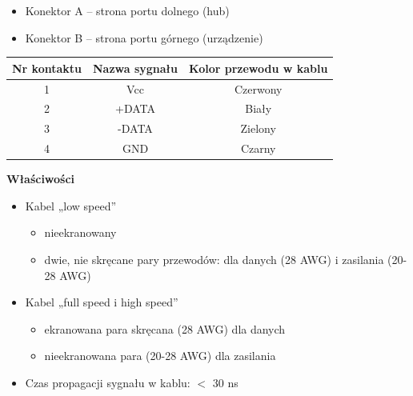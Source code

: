 \documentclass[a4paper,twoside]{article}
\begin{document}
			\begin{itemize}
				\item Konektor A – strona portu dolnego (hub)
				\item Konektor B – strona portu górnego (urządzenie)
			\end{itemize}
			\begin{table}[h]
				\begin{tabular}{|c|c|c|}
					\hline
					\textbf{Nr kontaktu}	& \textbf{Nazwa sygnału}	& \textbf{Kolor przewodu w kablu} \\ \hline
					1 						& Vcc						& Czerwony		\\ \hline
					2 						& +DATA						& Biały			\\ \hline
					3 						& -DATA						& Zielony		\\ \hline
					4 						& GND						& Czarny		\\ \hline
				\end{tabular}
			\end{table}
			\textbf{Właściwości}
			\begin{itemize}
				\item Kabel „low speed”
				\begin{itemize}
					\item nieekranowany
					\item dwie, nie skręcane pary przewodów: dla danych (28 AWG) i zasilania (20-28 AWG)
				\end{itemize}
				\item Kabel „full speed i high speed”
				\begin{itemize}
					\item ekranowana para skręcana (28 AWG) dla danych
					\item nieekranowana para (20-28 AWG) dla zasilania
				\end{itemize}
				\item Czas propagacji sygnału w kablu: $<$ 30 ns
			\end{itemize}
\end{document}
